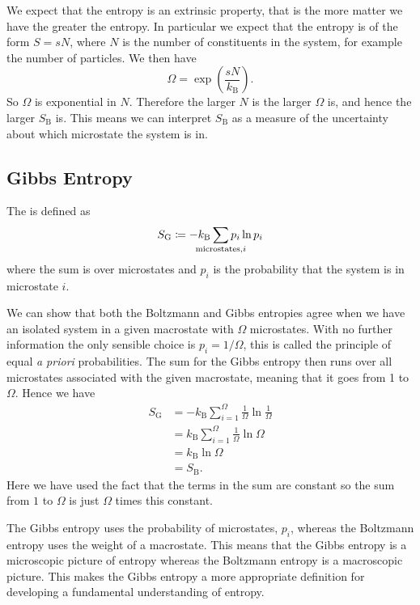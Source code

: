 \documentclass[fleqn]{NotesClass}
\newcommand*{\boltzmann}{k_{\mathrm{B}}}
\begin{document}
    We expect that the entropy is an extrinsic property, that is the more matter we have the greater the entropy.
    In particular we expect that the entropy is of the form \(S = sN\), where \(N\) is the number of constituents in the system, for example the number of particles.
    We then have
    \begin{equation}
        \Omega = \exp\left( \frac{sN}{\boltzmann} \right).
    \end{equation}
    So \(\Omega\) is exponential in \(N\).
    Therefore the larger \(N\) is the larger \(\Omega\) is, and hence the larger \(S_{\mathrm{B}}\) is.
    This means we can interpret \(S_{\mathrm{B}}\) as a measure of the uncertainty about which microstate the system is in.
    
    \subsection{Gibbs Entropy}
    The  is defined as
    \begin{equation}
        S_{\mathrm{G}} \coloneqq -\boltzmann \sum_{\mathclap{\mathrm{microstates}, i}} p_i \ln p_i
    \end{equation}
    where the sum is over microstates and \(p_i\) is the probability that the system is in microstate \(i\).
    
    We can show that both the Boltzmann and Gibbs entropies agree when we have an isolated system in a given macrostate with \(\Omega\) microstates.
    With no further information the only sensible choice is \(p_i = 1/\Omega\), this is called the principle of equal \textit{a priori} probabilities.
    The sum for the Gibbs entropy then runs over all microstates associated with the given macrostate, meaning that it goes from 1 to \(\Omega\).
    Hence we have
    \begin{align}
        S_{\mathrm{G}} &= -\boltzmann \sum_{i=1}^{\Omega} \frac{1}{\Omega} \ln \frac{1}{\Omega}\\
        &= \boltzmann \sum_{i=1}^{\Omega} \frac{1}{\Omega} \ln \Omega\\
        &= \boltzmann \ln \Omega\\
        &= S_{\mathrm{B}}.
    \end{align}
    Here we have used the fact that the terms in the sum are constant so the sum from \(1\) to \(\Omega\) is just \(\Omega\) times this constant.
    
    The Gibbs entropy uses the probability of microstates, \(p_i\), whereas the Boltzmann entropy uses the weight of a macrostate.
    This means that the Gibbs entropy is a microscopic picture of entropy whereas the Boltzmann entropy is a macroscopic picture.
    This makes the Gibbs entropy a more appropriate definition for developing a fundamental understanding of entropy.
    
\end{document}

